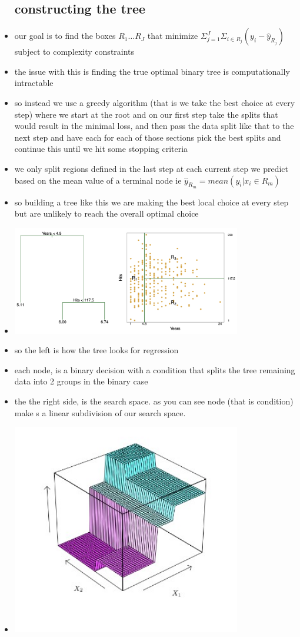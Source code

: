 \documentclass{article}
\begin{document}
\begin{itemize}
\subsection*{constructing the tree }
\item our goal is to find the boxes $R_1\dots R_J$ that minimize
 $\Sigma_{j=1}^{J}\Sigma_{i\in R_{j}}(y_i-\hat{y}_{R_{j}})$ subject to 
 complexity constraints 
\item the issue with this is finding the true optimal binary tree is computationally
intractable
\item so instead we use a greedy algorithm  (that is we take the best choice at every step)
where we start at the root and on our first step take the splits that would 
result in the minimal loss, and then pass the data split like that to the next
step and have each for each of those sections pick the best splits
and continue this until we hit some stopping criteria
\item we only split regions defined in the last step at each current step 
we predict based on the mean value of a terminal node ie $\hat{y}_{R_{m}}=mean(y_i|x_i\in R_{m})$ 
\item so building a tree like this we are making the best local choice at every step but are unlikely to reach the overall optimal choice
\item \includegraphics*[width=10cm]{lecture_notes/lecture_9/immages/l9_1.png}
\item so the left is how the tree looks for regression 
\item each node, is a binary decision with a condition that splits the tree remaining data into 2 groups in the binary case 
\item the the right side, is the search space. as you can see node (that is condition) make s a linear subdivision of our search space. 
\item \includegraphics[width=10cm]{lecture_notes/lecture_9/immages/l9_2.jpg}

\end{itemize}
\end{document}
